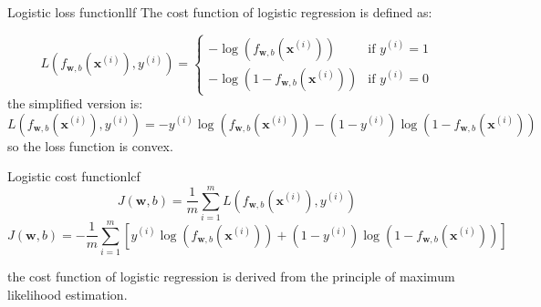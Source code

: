 \begin{dfnbox}{Logistic loss function}{llf}
    \hspace{2em}The cost function of logistic regression is defined as:\par
    \[
    L(f_{\mathbf{w}, b}(\mathbf{x}^{(i)}), y^{(i)})=
    \begin{cases}
        -\log(f_{\mathbf{w}, b}(\mathbf{x}^{(i)})) & \text{if } y^{(i)} = 1\\
        -\log(1 - f_{\mathbf{w}, b}(\mathbf{x}^{(i)})) & \text{if } y^{(i)} = 0
    \end{cases}
    \]
    the simplified version is:
    \begin{equation}
        L(f_{\mathbf{w}, b}(\mathbf{x}^{(i)}), y^{(i)}) = -y^{(i)} \log(f_{\mathbf{w}, b}(\mathbf{x}^{(i)})) - (1 - y^{(i)}) \log(1 - f_{\mathbf{w}, b}(\mathbf{x}^{(i)}))
    \end{equation}
    so the loss function is convex.
\end{dfnbox}

\begin{dfnbox}{Logistic cost function}{lcf}
    \begin{equation}
        J(\mathbf{w}, b) = \frac{1}{m} \sum_{i=1}^{m} L(f_{\mathbf{w}, b}(\mathbf{x}^{(i)}), y^{(i)})
    \end{equation}
    \begin{equation}
        J(\mathbf{w}, b) = -\frac{1}{m} \sum_{i=1}^{m} \left[y^{(i)} \log\left(f_{\mathbf{w}, b}\left(\mathbf{x}^{(i)}\right)\right) + \left(1 - y^{(i)}\right) \log\left(1 - f_{\mathbf{w}, b}
        \left(\mathbf{x}^{(i)}\right)\right)\right]
    \end{equation}
\end{dfnbox}

\begin{notebox}
    the cost function of logistic regression is derived from the principle of maximum likelihood estimation.
\end{notebox}

